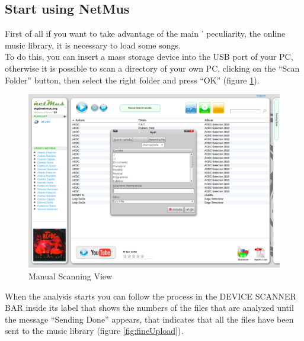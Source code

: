\newpage
\subsection{Start using NetMus}

First of all if you want to take advantage of the main ' peculiarity,
the online music library, it is necessary to load some songs.\\
To do this, you can insert a mass storage device
into the USB port of your PC, otherwise it is possible to scan a directory of
your own PC, clicking on the ``Scan Folder'' button, then select the right
folder and press ``OK'' (figure \ref{fig:scansioneManuale}).\\

\begin{figure}[!htbp]
  \centering
  \includegraphics[width=15cm]{img/MU/scan_manual.png}
\caption{Manual Scanning View}
\label{fig:scansioneManuale}
\end{figure}

When the analysis starts you can follow the process in the DEVICE SCANNER BAR
inside its label that shows the numbers of the files that are analyzed until
the message ``Sending Done'' appears, that indicates that all the files have
been sent to the music library (figure \ref{fig:fineUpload}).\\

